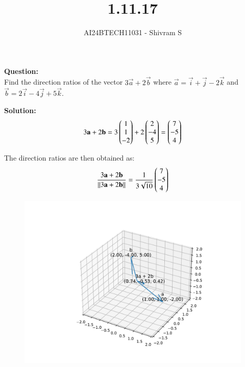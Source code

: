 \documentclass[journal]{IEEEtran}
\begin{document}

\vspace{3cm}

\title{1.11.17}
\author{AI24BTECH11031 - Shivram S
}
{\let\newpage\relax\maketitle}

\renewcommand{\thefigure}{\theenumi}
\renewcommand{\thetable}{\theenumi}
\setlength{\intextsep}{10pt} %


\renewcommand{\thetable}{\theenumi}


\textbf{Question: }\\
Find the direction ratios of the vector $3\vec{a} + 2\vec{b}$ where
$\vec{a} = \vec{i} + \vec{j} - 2\vec{k}$ and $\vec{b} = 2\vec{i} - 4\vec{j} + 5\vec{k}$.

\textbf{Solution: } \\
$$
3\mathbf{a} + 2\mathbf{b} = 3\begin{pmatrix}1 \\ 1 \\ -2\end{pmatrix} + 2\begin{pmatrix}2 \\ -4 \\ 5\end{pmatrix} = \begin{pmatrix}7 \\ -5 \\ 4\end{pmatrix}
$$

The direction ratios are then obtained as:
$$
\frac{3\mathbf{a} + 2\mathbf{b}}{\left\lVert3\mathbf{a} + 2\mathbf{b}\right\rVert} = \frac{1}{3\sqrt{10}} \begin{pmatrix}7 \\ -5 \\ 4\end{pmatrix}
$$


\begin{figure}[h!]
    \centering
    \includegraphics[width=0.7\linewidth]{figs/fig.pdf}
\end{figure}
\end{document}
